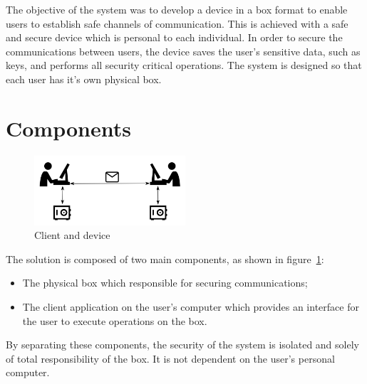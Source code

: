 \cleardoublepage
\label{chap:arch}

The objective of the system was to develop a device in a box format to enable users to establish safe channels of communication. This is achieved with a safe and secure device which is personal to each individual. In order to secure the communications between users, the device saves the user's sensitive data, such as keys, and performs all security critical operations.
The system is designed so that each user has it's own physical box.

\section{Components}\label{chap:arch:components}

\begin{figure}[h]
    \centering
    \includegraphics[width=0.5\textwidth]{./Images/main-figure2.png}
    \caption{Client and device}
    \label{fig:main-components}
\end{figure}

The solution is composed of two main components, as shown in figure~\ref{fig:main-components}:

\begin{itemize}
    \item The physical box which responsible for securing communications;
    \item The client application on the user's computer which provides an interface for the user to execute operations on the box.
\end{itemize}

By separating these components, the security of the system is isolated and solely of total responsibility of the box. It is not dependent on the user's personal computer.

